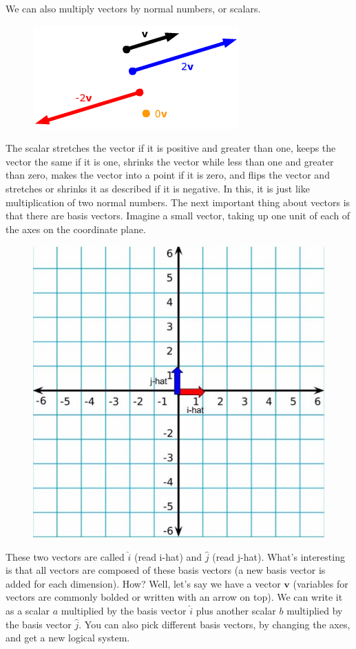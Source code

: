 We can also multiply vectors by normal numbers, or scalars.
\begin{center}
\begin{figure}[H]
\includegraphics[scale=0.5]{mult2.png}
\end{figure}
\end{center}
The scalar stretches the vector if it is positive and greater than one, keeps the vector the same if it is one, shrinks the vector while less than one and greater than zero, makes the vector into a point if it is zero, and flips the vector and stretches or shrinks it as described if it is negative.
In this, it is just like multiplication of two normal numbers. The next important thing about vectors is that there are basis vectors. Imagine a small vector, taking up one unit of each of the axes on the coordinate plane. 
\begin{center}
\begin{figure}[H]
\includegraphics[scale=0.25]{basis.jpg}
\end{figure}
\end{center}
These two vectors are called $\hat{i}$ (read i-hat) and $\hat{j}$ (read j-hat). What's interesting is that all vectors are composed of these basis vectors (a new basis vector is added for each dimension). How? Well, let's say we have a vector $\mathbf{v}$ (variables for vectors are commonly bolded or written with an arrow on top). We can write it as a scalar $a$ multiplied by the basis vector $\hat{i}$ plus another scalar $b$ multiplied by the basis vector $\hat{j}$. You can also pick different basis vectors, by changing the axes, and get a new logical system.
